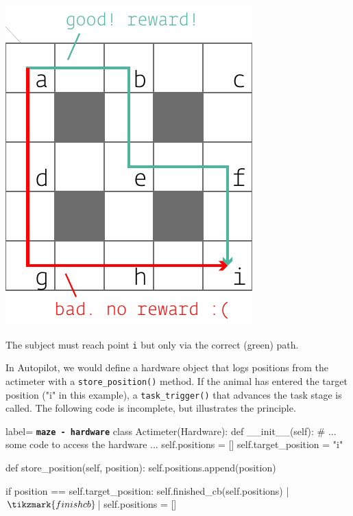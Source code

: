\begin{marginfigure}[0.65cm]
\includegraphics[]{figures/side_18_maze.pdf}
\caption{The subject must reach point \texttt{i} but only via the correct (green) path.}
\label{fig:maze}
\end{marginfigure}

In Autopilot, we would define a hardware object that logs positions from the actimeter with a \texttt{store_position()} method. If the animal has entered the target position ("i" in this example), a \texttt{task_trigger()} that advances the task stage is called. The following code is incomplete, but illustrates the principle.

\begin{pythoncode*}{label= \texttt{\textbf{maze - hardware}}}
class Actimeter(Hardware):
    def __init__(self):
        # ... some code to access the hardware ...
        self.positions = []
        self.target_position = "i"
        
    def store_position(self, position):
        self.positions.append(position)
        
        if position == self.target_position:
            self.finished_cb(self.positions) |$\tikzmark{finishcb}$|
            self.positions = []
\end{pythoncode*}
%

